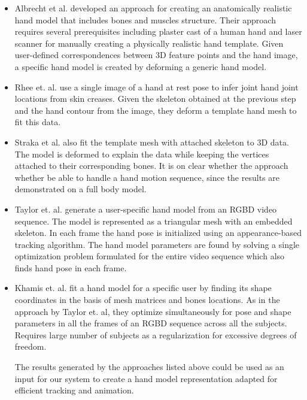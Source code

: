 \documentclass[10pt,journal,a4paper]{IEEEtran}
\begin{document}
\begin{itemize}

\item Albrecht et al. \cite{albrecht2003construction} developed an approach for creating an anatomically realistic hand model that includes bones and muscles structure. Their approach requires several prerequisites including plaster cast of a human hand and laser scanner for manually creating a physically realistic hand template. Given user-defined correspondences between 3D feature points and the hand image, a specific hand model is created by deforming a generic hand model. 

\item Rhee et. al. \cite{rhee2006human} use a single image of a hand at rest pose to infer joint hand joint locations from skin creases. Given the skeleton obtained at the previous step and the hand contour from the image, they deform a template hand mesh to fit this data. 

\item Straka et al. \cite{straka2012simultaneous} also fit the template mesh with attached skeleton to 3D data. The model is deformed to explain the data while keeping the vertices attached to their corresponding bones. It is on clear whether the approach whether be able to handle a hand motion sequence, since the results are demonstrated on a full body model.

\item Taylor et. al. \cite{taylor2014user} generate a user-specific hand model from an RGBD video sequence. The model is represented as a triangular mesh with an embedded skeleton. In each frame the hand pose is initialized using an appearance-based tracking algorithm. The hand model parameters are found by solving a single optimization problem formulated for the entire video sequence which also finds hand pose in each frame. 

\item Khamis et. al.  \cite{khamis12learning} fit a hand model for a specific user by finding its shape coordinates in the basis of mesh matrices and bones locations. As in the approach by Taylor et. al, they optimize simultaneously for pose and shape parameters in all the frames of an RGBD sequence across all the subjects. Requires large number of subjects as a regularization for excessive degrees of freedom. 

The results generated by the approaches listed above could be used as an input for our system to create a hand model representation adapted for efficient tracking and animation.


\end{itemize}
\end{document}
